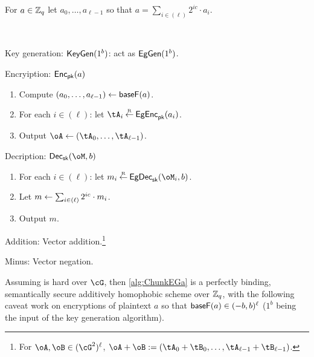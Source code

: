 \newcommand{\basefactor}{\MathAlgX{baseF}}
\begin{definition}\label{def:basefactor}
For $a\in {\mathbb Z}_q$ let $a_0,\ldots,a_{\ell-1}$ so that $a =  \sum_{i \in (\ell)}    2^{i c} \cdot a_i$.
\end{definition}

\begin{algorithm}\label{alg:ChunkEGa}~
	
	\item[Key generation:] $\mathsf{KeyGen}(1^b)$: act as $\mathsf{EgGen}(1^b)$.
	
	\item[Encryiption:] $\mathsf{Enc}_{\mathsf{pk}}(a)$
	
	\begin{enumerate}
		\item Compute $(a_0,\ldots,a_{\ell-1}) \asn \basefactor(a)$.
		
		\item For each $i\in (\ell)$: let $\tA_i \getsr \EgEnc_\pk(a_i)$.
		
		\item Output $\oA \asn (\tA_0,\ldots, \tA_{\ell-1})$.
		
	\end{enumerate}
	 
	\item[Decription:] $\Dec_\sk(\oM,b)$   
	\begin{enumerate}
		\item 	 For each $i\in (\ell)$: let $m_i \getsr \EgDec_\sk(\oM_i,b)$.
		
		\item Let  $m \leftarrow \sum_{i \in (\ell)}   2^{i c} \cdot  m_i $.
		
		\item Output $m$.
	\end{enumerate}
	
	\item[Addition:] Vector addition.\footnote{For $\oA,\oB \in (\cG^2)^\ell$, $\oA +\oB \eqdef (\tA_0+\tB_0,\ldots,\tA_{\ell-1}+\tB_{\ell-1})$.}
	
	\item[Minus:]  Vector negation.
	                     
	
\end{algorithm}


\begin{theorem}\label{thm:EGinExp}
	Assuming \DDH is hard over $\cG$, then \cref{alg:ChunkEGa} is  a perfectly binding,  semantically secure additively homophobic scheme over ${\mathbb Z}_q$, with the following caveat work on encryptions of plaintext  $a$ so that $\basefactor(a)\in (-b,b)^\ell$ ($1^b$ being the input of the key generation algorithm).
\end{theorem}



